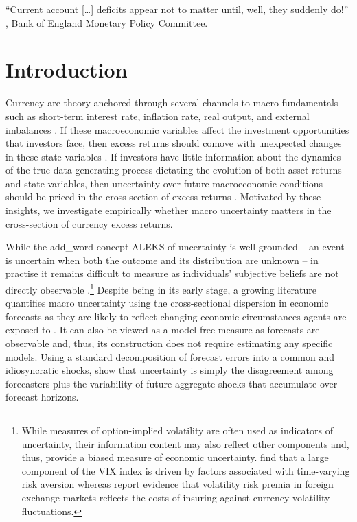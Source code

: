 \begin{flushright}
\textquotedblleft Current account [\ldots] deficits appear not to matter until, well, they suddenly do!\textquotedblright \\
\citet{sw:1999}, Bank of England Monetary Policy Committee. \\
\end{flushright}

\section{Introduction} \label{sec:introduction_UNC_CAR}
Currency are theory anchored through several channels to macro fundamentals such as short-term interest rate, inflation rate, real output, and external imbalances \citep[e.g.,][]{engel_west2005,gabaix_maggiori2015,lustig_etal2011}. If these macroeconomic variables affect the investment opportunities that investors face, then excess returns should comove with unexpected changes in these state variables \citep{merton1973}. If investors have little information about the dynamics of the true data generating process dictating the evolution of both asset returns and state variables, then uncertainty over future macroeconomic conditions should be priced in the cross-section of excess returns \citep[e.g.,][]{anderson_etal2009,Bali:2014}. Motivated by these insights, we investigate empirically whether macro uncertainty matters in the cross-section of currency excess returns.


While the add_word concept ALEKS of uncertainty is well grounded -- an event is uncertain when both the outcome and its distribution are unknown -- in practise it remains difficult to measure as individuals' subjective beliefs are not directly observable \citep[e.g.,][]{Bloom:2014}.\footnote{While measures of option-implied volatility are often used as indicators of uncertainty, their information content may also reflect other components and, thus, provide a biased measure of economic uncertainty. \citet{Bekaert/Hoerova/LoDuca:2013} find that a large component of the VIX index is driven by factors associated with time-varying risk aversion whereas \citet{dellacorte_etal2014} report evidence that volatility risk premia in foreign exchange markets reflects the costs of insuring against currency volatility fluctuations.} Despite being in its early stage, a growing literature quantifies macro uncertainty using the cross-sectional dispersion in economic forecasts as they are likely to reflect changing economic circumstances agents are exposed to \citep[e.g.,][]{beber_etal2010,Bloom2009,Bomberger:1996,Zarnowitz/Lambros:1987}. It can also be viewed as a model-free measure as forecasts are observable and, thus, its construction does not require estimating any specific models. Using a standard decomposition of forecast errors into a common and idiosyncratic shocks, \citet{lahiri_sheng2010} show that uncertainty is simply the disagreement among forecasters plus the variability of future aggregate shocks that accumulate over forecast horizons.

